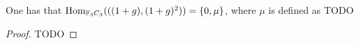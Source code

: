 \begin{theorem}
    One has that \( \operatorname{Hom}_{{\mathbb{F}}_3C_3}(((1 + g), (1 + g)^2)) = \left\{0, \mu\right\} \), where \( \mu \) is defined as
    TODO
\end{theorem}
\begin{proof}
    TODO
\end{proof}


